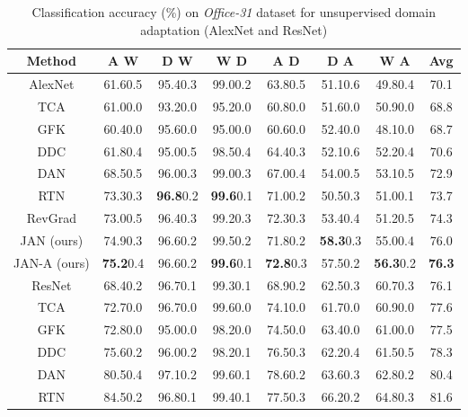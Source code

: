 \documentclass{article}
\begin{document}
\begin{table*}[!htbp]
  \addtolength{\tabcolsep}{2.0pt}
  \centering
  \caption{Classification accuracy (\%) on \emph{Office-31} dataset for unsupervised domain adaptation (AlexNet and ResNet)}
  \label{table:office31}
  \begin{small}
  \begin{tabular}{cccccccc}
    \Xhline{1pt}
    Method & A  W & D  W & W  D & A  D & D  A & W  A & Avg \\
    \hline
    AlexNet \cite{cite:NIPS12CNN} & 61.60.5 & 95.40.3 & 99.00.2 & 63.80.5 & 51.10.6 & 49.80.4 & 70.1 \\
    TCA \cite{cite:TNN11TCA} & 61.00.0 & 93.20.0 & 95.20.0 & 60.80.0 & 51.60.0 & 50.90.0 & 68.8 \\
    GFK \cite{cite:CVPR12GFK} & 60.40.0 & 95.60.0 & 95.00.0 & 60.60.0 & 52.40.0 & 48.10.0 & 68.7 \\
    DDC \cite{cite:Arxiv14DDC} & 61.80.4 & 95.00.5 & 98.50.4 & 64.40.3 & 52.10.6 & 52.20.4 & 70.6 \\
    DAN \cite{cite:ICML15DAN} & 68.50.5 & 96.00.3 & 99.00.3 & 67.00.4 & 54.00.5 & 53.10.5 & 72.9 \\
    RTN \cite{cite:NIPS16RTN} & 73.30.3 & \textbf{96.8}0.2 & \textbf{99.6}0.1 & 71.00.2 & 50.50.3 & 51.00.1 & 73.7 \\
    RevGrad \cite{cite:ICML15RevGrad} & 73.00.5 & 96.40.3 & 99.20.3 & 72.30.3 & 53.40.4 & 51.20.5 & 74.3 \\
    JAN (ours) & 74.90.3 & 96.60.2 & 99.50.2 & 71.80.2 & \textbf{58.3}0.3 & 55.00.4 & 76.0 \\
    JAN-A (ours) & \textbf{75.2}0.4 & 96.60.2 & \textbf{99.6}0.1 & \textbf{72.8}0.3 & 57.50.2 & \textbf{56.3}0.2 & \textbf{76.3} \\
    \hline
    ResNet \cite{cite:CVPR16DRL} & 68.40.2 & 96.70.1 & 99.30.1 & 68.90.2 & 62.50.3 & 60.70.3 & 76.1 \\
    TCA \cite{cite:TNN11TCA} & 72.70.0 & 96.70.0 & 99.60.0 & 74.10.0 & 61.70.0 & 60.90.0 & 77.6 \\
    GFK \cite{cite:CVPR12GFK} & 72.80.0 & 95.00.0 & 98.20.0 & 74.50.0 & 63.40.0 & 61.00.0 & 77.5 \\
    DDC \cite{cite:Arxiv14DDC} & 75.60.2 & 96.00.2 & 98.20.1 & 76.50.3 & 62.20.4 & 61.50.5 & 78.3 \\
    DAN \cite{cite:ICML15DAN} & 80.50.4 & 97.10.2 & 99.60.1 & 78.60.2 & 63.60.3 & 62.80.2 & 80.4 \\
    RTN \cite{cite:NIPS16RTN} & 84.50.2 & 96.80.1 & 99.40.1 & 77.50.3 & 66.20.2 & 64.80.3 & 81.6 \\

\end{tabular}
\end{small}
\end{table*}
\end{document}
